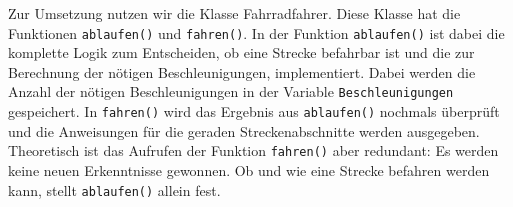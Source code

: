 
	Zur Umsetzung nutzen wir die Klasse Fahrradfahrer.
	Diese Klasse hat die Funktionen \texttt{ablaufen()} und \texttt{fahren()}.
	In der Funktion \texttt{ablaufen()} ist dabei die komplette Logik zum Entscheiden, ob eine Strecke befahrbar ist und die 
	zur Berechnung der nötigen Beschleunigungen, implementiert. 
	Dabei werden die Anzahl der nötigen Beschleunigungen in der Variable \texttt{Beschleunigungen} gespeichert.
	In \texttt{fahren()} wird das Ergebnis aus \texttt{ablaufen()} nochmals überprüft und die Anweisungen für die geraden Streckenabschnitte werden ausgegeben. 
	Theoretisch ist das Aufrufen der Funktion \texttt{fahren()} aber redundant: Es werden keine neuen Erkenntnisse gewonnen. 
	Ob und wie eine Strecke befahren werden kann, stellt \texttt{ablaufen()} allein fest.
	
